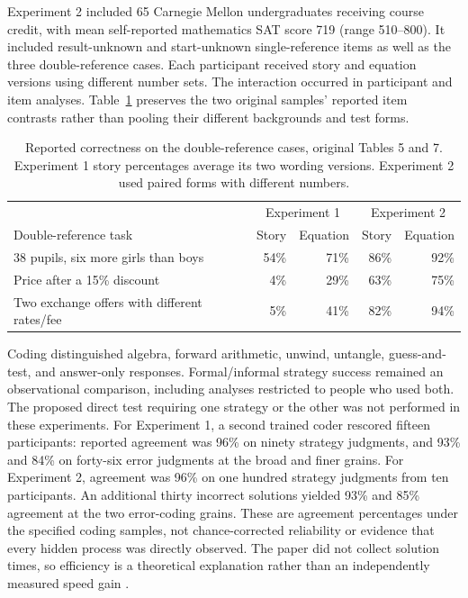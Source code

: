 Experiment 2 included 65 Carnegie Mellon undergraduates receiving
course credit, with mean self-reported mathematics SAT score 719
(range 510--800). It included result-unknown and start-unknown
single-reference items as well as the three double-reference cases.
Each participant received story and equation versions using different
number sets. The interaction occurred in participant and item analyses.
Table~\ref{tab:p19-cta-complex-items} preserves the two original
samples' reported item contrasts rather than pooling their different
backgrounds and test forms.

\begin{table}[htbp]
\centering
\small
\begin{tabular}{p{}rrrr}
\hline
 &\multicolumn{2}{c}{Experiment 1}&\multicolumn{2}{c}{Experiment 2}\\
Double-reference task &Story&Equation&Story&Equation\\ \hline
38 pupils, six more girls than boys&54\%&71\%&86\%&92\%\\
Price after a 15\% discount&4\%&29\%&63\%&75\%\\
Two exchange offers with different rates/fee&5\%&41\%&82\%&94\%\\ \hline
\end{tabular}
\caption{Reported correctness on the double-reference cases,
original Tables 5 and 7. Experiment 1 story percentages average its two
wording versions. Experiment 2 used paired forms with different numbers.}
\label{tab:p19-cta-complex-items}
\end{table}

Coding distinguished algebra, forward arithmetic, unwind, untangle,
guess-and-test, and answer-only responses. Formal/informal strategy
success remained an observational comparison, including analyses
restricted to people who used both. The proposed direct test requiring
one strategy or the other was not performed in these experiments.
For Experiment 1, a second trained coder rescored fifteen participants:
reported agreement was 96\% on ninety strategy judgments, and 93\%
and 84\% on forty-six error judgments at the broad and finer grains.
For Experiment 2, agreement was 96\% on one hundred strategy judgments
from ten participants. An additional thirty incorrect solutions yielded
93\% and 85\% agreement at the two error-coding grains.
These are agreement percentages under the specified coding samples,
not chance-corrected reliability or evidence that every hidden process
was directly observed.
The paper did not collect solution times, so efficiency is a
theoretical explanation rather than an independently measured speed gain
\cite[pp.~374,377--388,390--394]{KoedingerAlibaliNathan2008TradeoffsCTA}.

